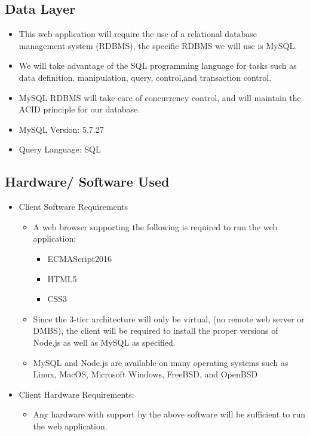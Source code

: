 \documentclass[letter, 12pt, titlepage]{article}
\begin{document}
		\subsection{Data Layer}
		
			\begin{itemize}
			
			\item	This web application will require the use of a relational database management system (RDBMS), the specific RDBMS we will use is  MySQL.
			\item We will take advantage of the SQL programming language for tasks such as data definition, manipulation, query, control,and transaction control.
			\item MySQL RDBMS will take care of concurrency control, and will maintain the ACID principle for our database. 
			\item MySQL Version: 5.7.27
			\item Query Language: SQL
			\end{itemize}
		\subsection{Hardware/ Software Used}
		
		\begin{itemize}

			\item Client Software Requirements
			\begin{itemize}
				\item A web browser supporting the following is required to run the web application:
					\begin{itemize}
						\item ECMAScript2016
						\item HTML5
						\item CSS3
					\end{itemize}
			\item Since the 3-tier architecture will only be virtual, (no remote web server or DMBS), the client will be required to install the proper versions of Node.js as well as MySQL as specified. 
			
			\item  MySQL and Node.js are available on many operating systems such as Linux, MacOS, Microsoft Windows, FreeBSD, and OpenBSD	
			\end{itemize}

		\item Client Hardware Requirements:
			\begin{itemize}	
				\item Any hardware with support by the above software will be sufficient to run the web application.
			\end{itemize}
		\end{itemize}
\end{document}

